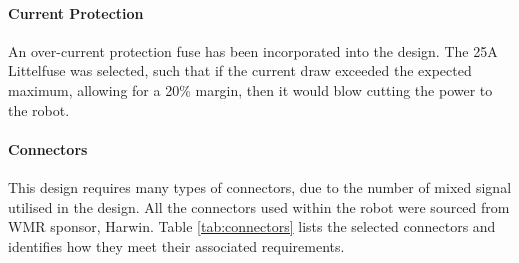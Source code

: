\paragraph{Current Protection}
An over-current protection fuse has been incorporated into the design. The 25A Littelfuse was selected, such that if the current draw exceeded the expected maximum, allowing for a 20\% margin, then it would blow cutting the power to the robot.\par

\paragraph{Connectors}
This design requires many types of connectors, due to the number of mixed signal utilised in the design. All the connectors used within the robot were sourced from WMR sponsor, Harwin. Table \ref{tab:connectors} lists the selected connectors and identifies how they meet their associated requirements.\par

\begin{table}[ht]
\caption{Harwin Connectors Used on Cyclones Battery Monitoring \& Distribution Board}
\label{tab:connectors}
\end{table}

